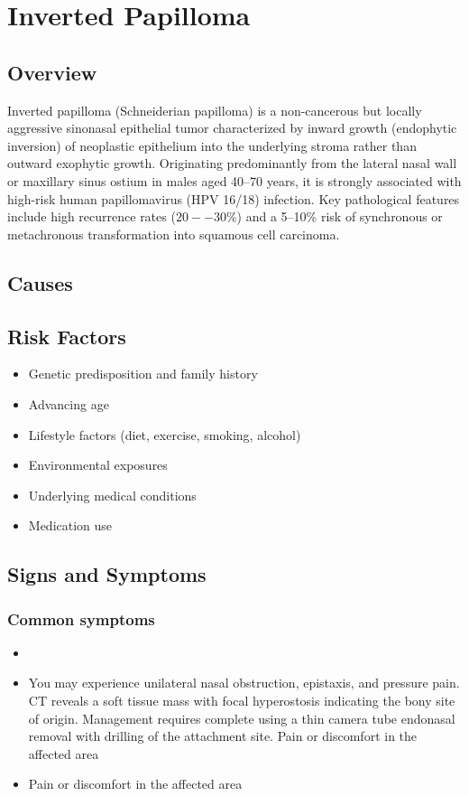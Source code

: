 \chapter{Inverted Papilloma}
\label{sec:Inverted Papilloma}

\section{Overview}
Inverted papilloma (Schneiderian papilloma) is a non-cancerous but locally aggressive sinonasal epithelial tumor characterized by inward growth (endophytic inversion) of neoplastic epithelium into the underlying stroma rather than outward exophytic growth. Originating predominantly from the lateral nasal wall or maxillary sinus ostium in males aged 40--70 years, it is strongly associated with high-risk human papillomavirus (HPV 16/18) infection. Key pathological features include high recurrence rates ($20--30\%$) and a 5--10\% risk of synchronous or metachronous transformation into squamous cell carcinoma.
\section{Causes}
\section{Risk Factors}

\begin{itemize}[noitemsep]
  \item Genetic predisposition and family history
  \item Advancing age
  \item Lifestyle factors (diet, exercise, smoking, alcohol)
  \item Environmental exposures
  \item Underlying medical conditions
  \item Medication use
\end{itemize}
\section{Signs and Symptoms}

\subsection{Common symptoms}
\begin{itemize}[noitemsep]
  \item \item You may experience unilateral nasal obstruction, epistaxis, and pressure pain. CT reveals a soft tissue mass with focal hyperostosis indicating the bony site of origin. Management requires complete using a thin camera tube endonasal removal with drilling of the attachment site. Pain or discomfort in the affected area    \item Pain or discomfort in the affected area
  \end{itemize}


